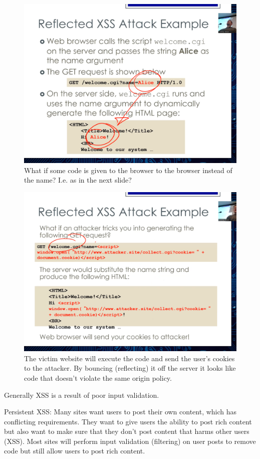 \documentclass[../notes.tex]{subfiles}
\begin{document}
\begin{figure}[H]
    \centering
    \includegraphics[width=0.8\linewidth]{img/image_2023-03-12-21-31-07.png}
    \caption{What if some code is given to the browser to the browser instead of the name? I.e. as in the next slide?}
\end{figure}


\begin{figure}[H]
    \centering
    \includegraphics[width=0.8\linewidth]{img/image_2023-03-12-21-32-01.png}
    \caption{The victim website will execute the code and send the user's cookies to the attacker. By bouncing (reflecting) it off the server it looks like code that doesn't violate the same origin policy.}
\end{figure}


Generally XSS is a result of poor input validation.



\begin{blockquote}
Persistent XSS: Many sites want users to post their own content, which has conflicting requirements. They want to give users the ability to post rich content but also want to make sure that they don't post content that harms other users (XSS). Most sites will perform input validation (filtering) on user posts to remove code but still allow users to post rich content.
\end{blockquote}
\end{document}
